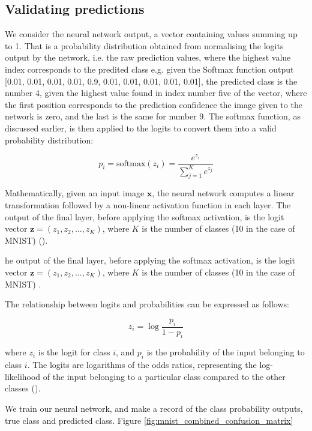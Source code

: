 \subsection{Validating predictions}

We consider the neural network output, a vector containing values summing up to 1. That is a probability distribution obtained from normalising the logits output by the network, i.e. the raw prediction values, where the highest value index corresponds to the predited class e.g. given the Softmax function output [0.01, 0.01, 0.01, 0.01, 0.9, 0.01, 0.01, 0.01, 0.01, 0.01], the predicted class is the number 4, given the highest value found in index number five of the vector, where the first position corresponds to the prediction confidence the image given to the network is zero, and the last is the same for number 9. The softmax function, as discussed earlier, is then applied to the logits to convert them into a valid probability distribution:

\begin{equation}
p_i = \text{softmax}(z_i) = \frac{e^{z_i}}{\sum_{j=1}^{K} e^{z_j}}
\end{equation}

Mathematically, given an input image $\mathbf{x}$, the neural network computes a linear transformation followed by a non-linear activation function in each layer. The output of the final layer, before applying the softmax activation, is the logit vector $\mathbf{z} = (z_1, z_2, \dots, z_K)$, where $K$ is the number of classes (10 in the case of MNIST) (\cite{goodfellow2016deep}).

he output of the final layer, before applying the softmax activation, is the logit vector $\mathbf{z} = (z_1, z_2, \dots, z_K)$, where $K$ is the number of classes (10 in the case of MNIST) \cite{goodfellow2016deep}.

The relationship between logits and probabilities can be expressed as follows:

\begin{equation}
z_i = \log \frac{p_i}{1 - p_i}
\end{equation}

where $z_i$ is the logit for class $i$, and $p_i$ is the probability of the input belonging to class $i$. The logits are logarithms of the odds ratios, representing the log-likelihood of the input belonging to a particular class compared to the other classes (\cite{bishop2006pattern}).

We train our neural network, and make a record of the class probability outputs, true class and predicted class. Figure \ref{fig:mnist_combined_confusion_matrix}


